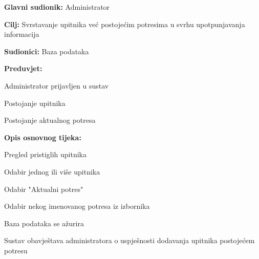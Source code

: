 					\noindent {}
					\begin{packed_item}
	
						\item \textbf{Glavni sudionik:} Administrator
						\item \textbf{Cilj:} Svrstavanje upitnika već postojećim potresima u svrhu upotpunjavanja informacija
						\item \textbf{Sudionici:} Baza podataka
						\item \textbf{Preduvjet:} 
						\begin{packed_item}
							\item Administrator prijavljen u sustav
							\item Postojanje upitnika
							\item Postojanje aktualnog potresa
						\end{packed_item}

						\item \textbf{Opis osnovnog tijeka:}
						
						\item[] \begin{packed_enum}
	
							\item Pregled pristiglih upitnika
							\item Odabir jednog ili više upitnika
							\item Odabir "Aktualni potres"
							\item Odabir nekog imenovanog potresa iz izbornika
							\item Baza podataka se ažurira
							\item Sustav obavještava administratora o uspješnosti dodavanja upitnika postojećem potresu
							
						\end{packed_enum}
					\end{packed_item}

